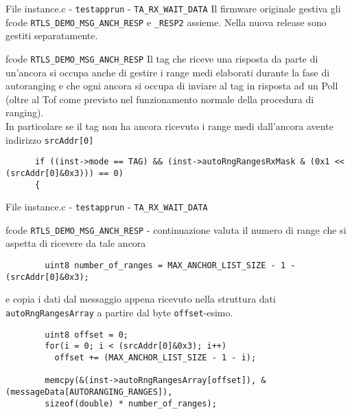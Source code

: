 \begin{frame}[fragile]{File instance.c - \lstinline!testapprun! - \lstinline!TA_RX_WAIT_DATA!}
  Il firmware originale gestiva gli fcode \lstinline!RTLS_DEMO_MSG_ANCH_RESP! e \lstinline!_RESP2!
  assieme. Nella nuova release sono gestiti separatamente.
  \begin{block}{fcode \lstinline!RTLS_DEMO_MSG_ANCH_RESP!}
    Il tag che riceve una risposta da parte di un'ancora si occupa anche di gestire i range medi
    elaborati durante la fase di autoranging e che ogni ancora si occupa di inviare al tag in risposta
    ad un Poll (oltre al Tof come previsto nel funzionamento normale della procedura di ranging).\\
    In particolare se il tag non ha ancora ricevuto i range medi dall'ancora avente indirizzo
    \lstinline!srcAddr[0]!
    \begin{lstlisting}
      if ((inst->mode == TAG) && (inst->autoRngRangesRxMask & (0x1 << (srcAddr[0]&0x3))) == 0)
      {
    \end{lstlisting}
  \end{block}
\end{frame}

\begin{frame}[fragile]{File instance.c - \lstinline!testapprun! - \lstinline!TA_RX_WAIT_DATA!}
  \begin{block}{fcode \lstinline!RTLS_DEMO_MSG_ANCH_RESP! - continuazione}
    valuta il numero di range che si aspetta di ricevere da tale ancora
    \begin{lstlisting}
        uint8 number_of_ranges = MAX_ANCHOR_LIST_SIZE - 1 - (srcAddr[0]&0x3);
    \end{lstlisting}
    e copia i dati dal messaggio appena ricevuto nella struttura dati \lstinline!autoRngRangesArray!
    a partire dal byte \lstinline!offset!-esimo.
    \begin{lstlisting}
        uint8 offset = 0;
        for(i = 0; i < (srcAddr[0]&0x3); i++)
          offset += (MAX_ANCHOR_LIST_SIZE - 1 - i);

        memcpy(&(inst->autoRngRangesArray[offset]), &(messageData[AUTORANGING_RANGES]),
        sizeof(double) * number_of_ranges);
    \end{lstlisting}
  \end{block}
\end{frame}

